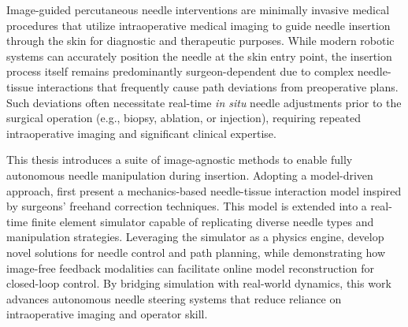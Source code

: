 




Image-guided percutaneous needle interventions are minimally invasive medical procedures that utilize intraoperative medical imaging to guide needle insertion through the skin for diagnostic and therapeutic purposes. While modern robotic systems can accurately position the needle at the skin entry point, the insertion process itself remains predominantly surgeon-dependent due to complex needle-tissue interactions that frequently cause path deviations from preoperative plans. Such deviations often necessitate real-time \textit{in situ} needle adjustments prior to the surgical operation (e.g., biopsy, ablation, or injection), requiring repeated intraoperative imaging and significant clinical expertise.

This thesis introduces a suite of image-agnostic methods to enable fully autonomous needle manipulation during insertion. Adopting a model-driven approach,  first present a mechanics-based needle-tissue interaction model inspired by surgeons' freehand correction techniques. This model is extended into a real-time finite element simulator capable of replicating diverse needle types and manipulation strategies. Leveraging the simulator as a physics engine,  develop novel solutions for needle control and path planning, while demonstrating how image-free feedback modalities can facilitate online model reconstruction for closed-loop control. By bridging simulation with real-world dynamics, this work advances autonomous needle steering systems that reduce reliance on intraoperative imaging and operator skill.


